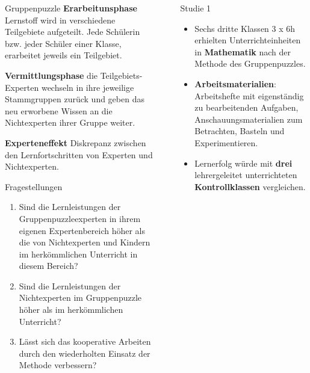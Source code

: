 \documentclass[final]{beamer}
\newlength{\sepwid}
\newlength{\onecolwid}
\newlength{\twocolwid}
\begin{document}
\begin{frame}[t]
\begin{columns}[t]
\begin{column}{\onecolwid}
\begin{block}{Gruppenpuzzle}
\textbf{Erarbeitunsphase} Lernstoff wird in verschiedene Teilgebiete aufgeteilt. Jede Schülerin bzw. jeder Schüler einer Klasse, erarbeitet jeweils ein Teilgebiet. 

\textbf{Vermittlungsphase} die Teilgebiets-Experten wechseln in ihre jeweilige Stammgruppen zurück und geben das neu erworbene Wissen an die Nichtexperten ihrer Gruppe weiter. 

\textbf{Experteneffekt} Diskrepanz zwischen den Lernfortschritten von Experten und Nichtexperten.  
\end{block}


\begin{alertblock}{Fragestellungen}
\begin{enumerate}
\item Sind die Lernleistungen der Gruppenpuzzleexperten in ihrem eigenen Expertenbereich höher als die von Nichtexperten und Kindern im herkömmlichen Unterricht in diesem Bereich?
\item Sind die Lernleistungen der Nichtexperten im Gruppenpuzzle höher als im herkömmlichen Unterricht?
\item Lässt sich das kooperative Arbeiten durch den wiederholten Einsatz der Methode verbessern?
\end{enumerate}
\end{alertblock}


\end{column} %


\begin{column}{\sepwid}\end{column} %
\begin{column}{\twocolwid} %

\begin{columns}[t,totalwidth=\twocolwid] %
\begin{column}{\onecolwid}\vspace{-.6in} %
\begin{block}{Studie 1}
\begin{itemize}
\justifying
\item Sechs dritte Klassen 3 x 6h erhielten Unterrichteinheiten in \textbf{Mathematik} nach der Methode des Gruppenpuzzles.
\item \textbf{Arbeitsmaterialien}: Arbeitshefte mit eigenständig zu bearbeitenden Aufgaben, Anschauungsmaterialien zum Betrachten, Basteln und Experimentieren.
\item Lernerfolg würde mit \textbf{drei} lehrergeleitet unterrichteten \textbf{Kontrollklassen} vergleichen.
\end{itemize}
\end{block}
\end{column} %



\end{columns}
\end{column}
\end{columns}
\end{frame}
\end{document}
